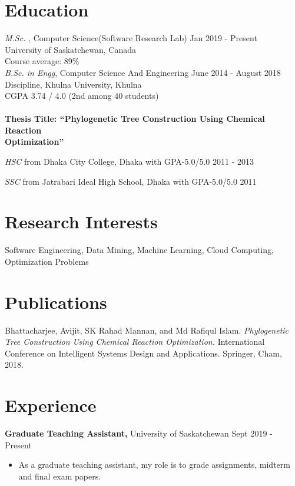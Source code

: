 \documentclass[margin]{res}
\begin{document}
\begin{resume}
\section{Education}
\textit{M.Sc. }, Computer Science(Software Research Lab) \hfill Jan 2019 - Present \\ University of Saskatchewan, Canada \\
Course average: 89\%\\

\textit{B.Sc. in Engg}, Computer Science And Engineering \hfill June 2014 - August 2018\\ Discipline, Khulna University, Khulna \\
CGPA 3.74 / 4.0 (2nd among 40 students) \\
\\
\textbf{ Thesis Title: ``Phylogenetic Tree Construction Using Chemical Reaction\\ Optimization''}

\textit{HSC} from Dhaka City College, Dhaka with GPA-5.0/5.0
 \hfill  2011 - 2013  
 
\textit{SSC} from Jatrabari Ideal High School, Dhaka with GPA-5.0/5.0
\hfill  2011
 \section{Research Interests} 
Software Engineering, Data Mining, Machine Learning, Cloud Computing, Optimization Problems

\section{Publications}
Bhattacharjee, Avijit, SK Rahad Mannan, and Md Rafiqul Islam. \textit{Phylogenetic Tree Construction Using Chemical Reaction Optimization.} International Conference on Intelligent Systems Design and Applications. Springer, Cham, 2018.\href{https://link.springer.com/chapter/10.1007/978-3-030-16660-1_89}{\faLink}

\section{Experience}

{\bf Graduate Teaching Assistant,} University of Saskatchewan 
\hfill Sept 2019 - Present
 \begin{itemize} \itemsep -2pt  %
 \item As a graduate teaching assistant, my role is to grade assignments, midterm and final exam papers. 
 

\end{itemize}
\end{resume}
\end{document}
